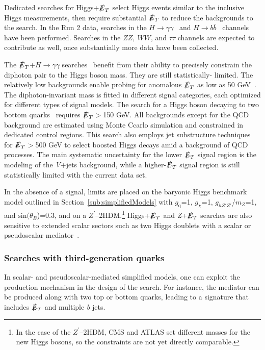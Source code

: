\documentclass{ar-1col}
\newcommand{\chiDM}{\ensuremath{\chi}\xspace}
\newcommand{\gDM}{\ensuremath{g_{\chiDM}}\xspace}
\newcommand{\gdm}{\gDM}
\newcommand{\gq}{$g_{\mathrm{q}}$\xspace}
\newcommand{\ghZprimeZprime}{\ensuremath{g_{hZ'Z'}}\xspace}
\newcommand{\sinthetab}{\ensuremath{\mathrm{sin}(\theta_B})\xspace}
\newcommand{\MET}{\ensuremath{\slashed{E}_T}\xspace}
\newcommand{\Zprime}{\ensuremath{{Z}^\prime}\xspace}
\begin{document}
Dedicated searches for Higgs+\MET  select Higgs events similar to
the inclusive Higgs measurements, then require substantial \MET to
reduce the backgrounds to the search. In the Run 2 data, searches
in the $H \rightarrow
\gamma\gamma$~\cite{CMS-PAS-EXO-16-054,Aaboud:2017uak} and $H
\rightarrow b\bar{b}$~\cite{Aaboud:2017yqz} channels have been
performed. Searches in the $ZZ,~WW$, and $\tau\tau$ channels are
expected to contribute as well, once substantially more data have been
collected.

The \MET+$H \rightarrow \gamma\gamma$
searches~\cite{CMS-PAS-EXO-16-054,Aaboud:2017uak} benefit from
their ability to precisely constrain the diphoton pair to the
Higgs boson mass. They are still statistically- limited. The
relatively low backgrounds enable probing for anomalous \MET as low
as 50 GeV~\cite{CMS-PAS-EXO-16-054}. The diphoton-invariant mass
is fitted in different signal categories, each optimized for
different types of signal models. The search for a Higgs boson decaying to
two bottom quarks~\cite{Aaboud:2017yqz} requires \MET$>$150 GeV.
All backgrounds except for the QCD background are estimated using
Monte Ccarlo simulation and constrained in dedicated control regions. This search
also employs jet substructure techniques for \MET$>$500 GeV to
select boosted Higgs decays amid a background of QCD processes.
The main systematic uncertainty for the lower \MET signal region
is the modeling of the \textit{V}+jets background, while a higher-\MET
signal region is still statistically limited with the current
data set.

In the absence of a signal, limits are placed on the baryonic Higgs benchmark
model outlined in Section~\ref{sub:simplifiedModels} with \gq=1,
\gdm=1, \ghZprimeZprime/$m_{Z}$=1, and \sinthetab=0.3, and on a
\Zprime--2HDM.\footnote{In the case of the \Zprime--2HDM, CMS and ATLAS set different masses for the new Higgs
bosons, so the constraints are not yet directly comparable.} 
Higgs+\MET and \textit{Z}+\MET searches are also sensitive to extended
scalar sectors such as two Higgs doublets with a scalar or
pseudoscalar
mediator~\cite{Bauer:2017ota,Goncalves:2016iyg,Bell:2016ekl}.

\subsubsection{Searches with third-generation quarks}

In scalar- and pseudoscalar-mediated simplified models, one can
exploit the production mechanism in the design of the search. For
instance, the mediator can be produced along with two top or
bottom quarks, leading to a signature that includes \MET and multiple \textit{b} jets.
\end{document}
